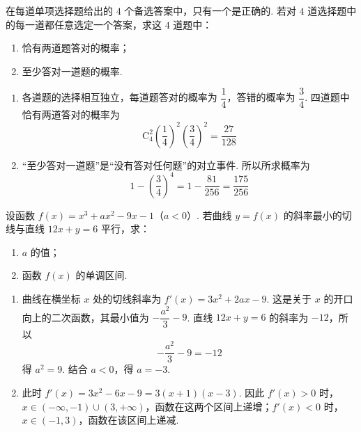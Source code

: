 \begin{problem}
在每道单项选择题给出的 \(4\) 个备选答案中，只有一个是正确的. 若对 \(4\) 道选择题中的每一道都任意选定一个答案，求这 \(4\) 道题中：
\begin{enumerate}
\item 恰有两道题答对的概率；
\item 至少答对一道题的概率.
\end{enumerate}
\end{problem}

\begin{solution}
\begin{enumerate}
\item 各道题的选择相互独立，每道题答对的概率为 \(\dfrac14\)，答错的概率为 \(\dfrac34\). 四道题中恰有两道答对的概率为
\[
\mathrm C_{4}^{2}\left(\frac14\right)^{2}\left(\frac34\right)^{2}=\frac{27}{128}
\]
\item “至少答对一道题”是“没有答对任何题”的对立事件. 所以所求概率为
\[
1-\left(\frac34\right)^{4}=1-\frac{81}{256}=\frac{175}{256}
\]
\end{enumerate}
\end{solution}

\begin{problem}
设函数 \( f(x) = x^{3} + ax^{2} - 9x - 1 \)（\(a < 0\)）. 若曲线 \( y = f(x) \) 的斜率最小的切线与直线 \( 12x + y = 6 \) 平行，求：
\begin{enumerate}
\item \(a\) 的值；
\item 函数 \( f(x) \) 的单调区间.
\end{enumerate}
\end{problem}

\begin{solution}
\begin{enumerate}
\item 曲线在横坐标 \(x\) 处的切线斜率为 \(f'(x)=3x^{2}+2ax-9\). 这是关于 \(x\) 的开口向上的二次函数，其最小值为 \(-\dfrac{a^{2}}{3}-9\). 直线 \(12x+y=6\) 的斜率为 \(-12\)，所以
\[
-\frac{a^{2}}{3}-9=-12
\]
得 \(a^{2}=9\). 结合 \(a<0\)，得 \(a=-3\).
\item 此时 \(f'(x)=3x^{2}-6x-9=3(x+1)(x-3)\). 因此 \(f'(x)>0\) 时，\(x\in(-\infty,-1)\cup(3,+\infty)\)，函数在这两个区间上递增；\(f'(x)<0\) 时，\(x\in(-1,3)\)，函数在该区间上递减.
\end{enumerate}
\end{solution}

